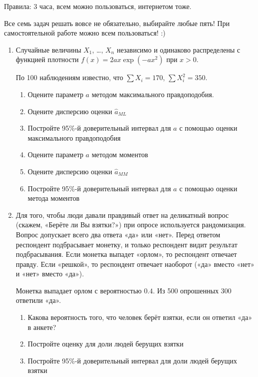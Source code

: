 Правила: 3 часа, всем можно пользоваться, интернетом тоже.

Все семь задач решать вовсе не обязательно, выбирайте любые пять!
При самостоятельной работе можно всем пользоваться! :)

\begin{enumerate}

\item Случайные величины $X_1$, \ldots, $X_n$ независимо и одинаково распределены
с функцией плотности $f(x)=2ax\exp(-ax^2)$ при $x>0$.

По 100 наблюдениям известно, что $\sum X_i = 170$, $\sum X_i^2 = 350$.

\begin{enumerate}
\item Оцените параметр $a$ методом максимального правдоподобия.
\item Оцените дисперсию оценки $\hat a_{ML}$
\item Постройте 95\%-й доверительный интервал для $a$ с помощью оценки
максимального правдоподобия
\item Оцените параметр $a$ методом моментов
\item Оцените дисперсию оценки $\hat a_{MM}$
\item Постройте 95\%-й доверительный интервал для $a$ с помощью оценки метода моментов
\end{enumerate}

\item Для того, чтобы люди давали правдивый ответ на деликатный вопрос (скажем,
«Берёте ли Вы взятки?») при опросе используется рандомизация. Вопрос допускает
всего два ответа «да» или «нет». Перед ответом респондент подбрасывает монетку,
и только респондент видит результат подбрасывания. Если монетка выпадет «орлом»,
то респондент отвечает правду. Если «решкой», то респондент отвечает наоборот
(«да» вместо «нет» и «нет» вместо «да»).

Монетка выпадает орлом с вероятностью $0.4$. Из 500 опрошенных 300 ответили «да».

\begin{enumerate}
\item Какова вероятность того, что человек берёт взятки, если он ответил «да» в анкете?
\item Постройте оценку для доли людей берущих взятки
\item Постройте 95\%-й доверительный интервал для доли людей берущих взятки
\end{enumerate}


\end{enumerate}
